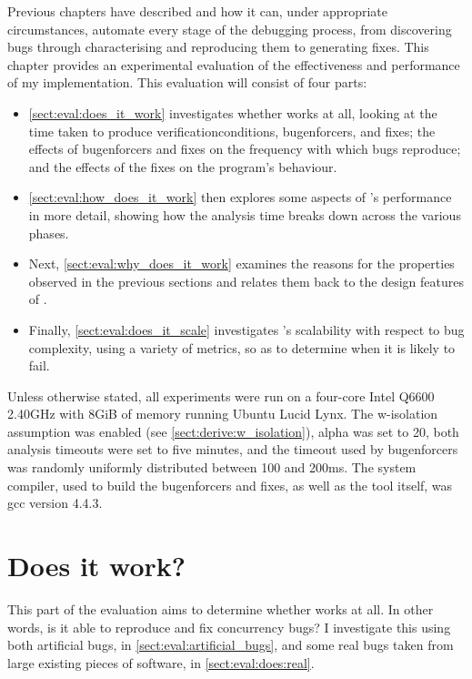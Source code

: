 \noindent
Previous chapters have described {\technique} and how it can, under
appropriate circumstances, automate every stage of the debugging
process, from discovering bugs through characterising and reproducing
them to generating fixes.  This chapter provides an experimental
evaluation of the effectiveness and performance of my implementation.
This evaluation will consist of four parts:
\begin{itemize}
\item \autoref{sect:eval:does_it_work} investigates whether
  {\technique} works at all, looking at the time taken to produce
  \glspl{verificationcondition}, \glspl{bugenforcer}, and fixes; the
  effects of \glspl{bugenforcer} and fixes on the frequency with which
  bugs reproduce; and the effects of the fixes on the program's
  behaviour.
\item \autoref{sect:eval:how_does_it_work} then explores some aspects
  of {\technique}'s performance in more detail, showing how the
  analysis time breaks down across the various phases.
\item Next, \autoref{sect:eval:why_does_it_work} examines the reasons
  for the properties observed in the previous sections and relates
  them back to the design features of {\technique}.
\item Finally, \autoref{sect:eval:does_it_scale} investigates
  {\technique}'s scalability with respect to bug complexity, using a
  variety of metrics, so as to determine when it is likely to fail.
\end{itemize}
Unless otherwise stated, all experiments were run on a four-core Intel
Q6600 2.40GHz with 8GiB of memory running Ubuntu Lucid Lynx.  The
\gls{w-isolation} assumption was enabled (see
\autoref{sect:derive:w_isolation}), \gls{alpha} was set to 20, both
analysis timeouts were set to five minutes, and the timeout used by
\glspl{bugenforcer} was randomly uniformly distributed between 100 and
200ms.  The system compiler, used to build the \glspl{bugenforcer} and
fixes, as well as the {\technique} tool itself, was gcc version 4.4.3.

\section{Does it work?}
\label{sect:eval:does_it_work}

This part of the evaluation aims to determine whether
{\technique} works at all.  In other words, is it able to
reproduce and fix concurrency bugs?  I investigate this using both
artificial bugs, in \autoref{sect:eval:artificial_bugs}, and some real
bugs taken from large existing pieces of software, in
\autoref{sect:eval:does:real}.

